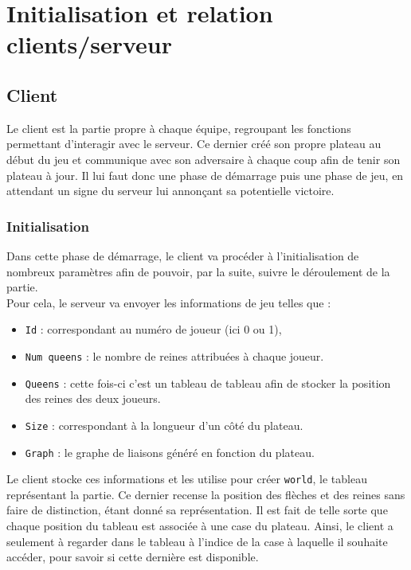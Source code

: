 \chapter{Initialisation et relation clients/serveur}
\label{chap:init_relation}
 
\section{Client}
\label{sec:client}

Le client est la partie propre à chaque équipe, regroupant les fonctions permettant d'interagir avec le serveur. Ce dernier créé son propre plateau au début du jeu et communique avec son adversaire à chaque coup afin de tenir son plateau à jour. Il lui faut donc une phase de démarrage puis une phase de jeu, en attendant un signe du serveur lui annonçant sa potentielle victoire.

\subsection{Initialisation}
\label{subsec:client_init}

Dans cette phase de démarrage, le client va procéder à l'initialisation de nombreux paramètres afin de pouvoir, par la suite, suivre le déroulement de la partie.\\
Pour cela, le serveur va envoyer les informations de jeu telles que :
\begin{itemize}
    \item \texttt{Id} : correspondant au numéro de joueur (ici 0 ou 1),
    \item \texttt{Num queens} : le nombre de reines attribuées à chaque joueur.
    \item  \texttt{Queens} : cette fois-ci c'est un tableau de tableau afin de stocker la position des reines des deux joueurs.
    \item  \texttt{Size} : correspondant à la longueur d'un côté du plateau.
    \item  \texttt{Graph} : le graphe de liaisons généré en fonction du plateau.
\end{itemize}

\bigbreak

Le client stocke ces informations et les utilise pour créer \texttt{world}, le tableau représentant la partie. Ce dernier recense la position des flèches et des reines sans faire de distinction, étant donné sa représentation. Il est fait de telle sorte que chaque position du tableau est associée à une case du plateau. Ainsi, le client a seulement à regarder dans le tableau à l'indice de la case à laquelle il souhaite accéder, pour savoir si cette dernière est disponible. 

